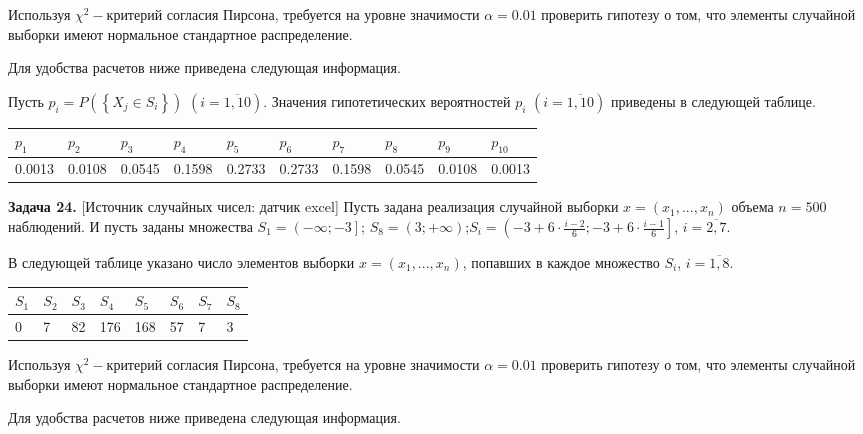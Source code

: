 Используя $\chi ^{2} -$критерий согласия Пирсона, требуется на уровне значимости $\alpha =0.01$ проверить гипотезу о том, что элементы случайной выборки имеют нормальное стандартное распределение.

Для удобства расчетов ниже приведена следующая информация.

Пусть $p_{i} =P\left(\left\{X_{j} \in S_{i} \right\}\right)$ $\left(i=\overline{1,10}\right)$. Значения гипотетических вероятностей $p_{i} $ $\left(i=\overline{1,10}\right)$ приведены в следующей таблице.

\begin{tabular}{|p{0.4in}|p{0.4in}|p{0.4in}|p{0.4in}|p{0.4in}|p{0.4in}|p{0.4in}|p{0.4in}|p{0.4in}|p{0.4in}|} \hline 
$p_{1} $ & $p_{2} $ & $p_{3} $ & $p_{4} $ & $p_{5} $ & $p_{6} $ & $p_{7} $ & $p_{8} $ & $p_{9} $ & $p_{10} $ \\ \hline 
0.0013 & 0.0108 & 0.0545 & 0.1598 & 0.2733 & 0.2733 & 0.1598 & 0.0545 & 0.0108 & 0.0013 \\ \hline 
\end{tabular}



\textbf{Задача 24.} [Источник случайных чисел: датчик excel] Пусть задана реализация случайной выборки $x=\left(x_{1} ,...,x_{n} \right)$ объема $n=500$ наблюдений. И пусть заданы множества $S_{1} =\left(-\infty ;-3\right]$; $S_{8} =\left(3;+\infty \right)$;$S_{i} =\left(-3+6\cdot {\tfrac{i-2}{6}} ;-3+6\cdot {\tfrac{i-1}{6}} \right]$, $i=\overline{2,7}$. 

В следующей таблице указано число элементов выборки $x=\left(x_{1} ,...,x_{n} \right)$, попавших в каждое множество $S_{i} $, $i=\overline{1,8}$.

\begin{tabular}{|p{0.3in}|p{0.3in}|p{0.3in}|p{0.3in}|p{0.3in}|p{0.3in}|p{0.3in}|p{0.3in}|} \hline 
$S_{1} $ & $S_{2} $ & $S_{3} $ & $S_{4} $ & $S_{5} $ & $S_{6} $ & $S_{7} $ & $S_{8} $ \\ \hline 
0 & 7 & 82 & 176 & 168 & 57 & 7 & 3 \\ \hline 
\end{tabular}



Используя $\chi ^{2} -$критерий согласия Пирсона, требуется на уровне значимости $\alpha =0.01$ проверить гипотезу о том, что элементы случайной выборки имеют нормальное стандартное распределение.

Для удобства расчетов ниже приведена следующая информация.

